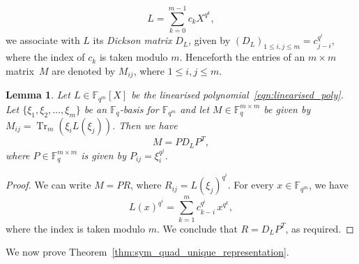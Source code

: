 \documentclass[10pt]{article}
\newtheorem{lemma}[theorem]{Lemma}
\theoremstyle{definition}
\newcommand{\FF}{\mathbb{F}}
\DeclareMathOperator{\Tr}{Tr}
\begin{document}
\begin{equation}
L=\sum_{k=0}^{m-1}c_kX^{q^k},   \label{eqn:linearised_poly}
\end{equation}
we associate with $L$ its \emph{Dickson matrix} $D_L$, given by $(D_L)_{1\le i,j\le m}=c_{j-i}^{q^i}$, where the index of $c_k$ is taken modulo $m$. Henceforth the entries of an $m\times m$ matrix~$M$ are denoted by $M_{ij}$, where $1\le i,j\le m$.
\begin{lemma}
\label{lem:lin_poly_to_mat}
Let $L\in\FF_{q^m}[X]$ be the linearised polynomial~\eqref{eqn:linearised_poly}. Let $\{\xi_1,\xi_2,\dots,\xi_m\}$ be an $\FF_q$-basis for $\FF_{q^m}$ and let $M\in\FF_q^{m\times m}$ be given by  $M_{ij}=\Tr_m(\xi_iL(\xi_j))$. Then we have
\[
M=PD_LP^T,
\]
where $P\in\FF_q^{m\times m}$ is given by $P_{ij}=\xi_i^{q^j}$.
\end{lemma}
\begin{proof}
We can write $M=PR$, where $R_{ij}=L(\xi_j)^{q^i}$. For every $x\in\FF_{q^m}$, we have
\[
L(x)^{q^i}=\sum_{k=1}^mc_{k-i}^{q^i}\,x^{q^k},
\]
where the index is taken modulo $m$. We conclude that $R=D_LP^T$, as required.
\end{proof}
\par
We now prove Theorem~\ref{thm:sym_quad_unique_representation}.
\end{document}
